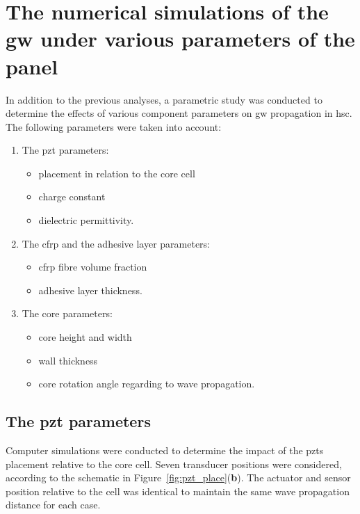 \section{The numerical simulations of the \acl{gw} under various parameters of the panel}
\label{sec:parameters}

In addition to the previous analyses, a parametric study was conducted to determine the effects of various component parameters on \ac{gw} propagation in \ac{hsc}. The following parameters were taken into account:
\begin{enumerate}
	\item The \ac{pzt} parameters:
	\begin{itemize}
		\item placement in relation to the core cell
		\item charge constant
		\item dielectric permittivity.
	\end{itemize}
	\item The \ac{cfrp} and the adhesive layer parameters:
		\begin{itemize}
		\item \ac{cfrp} fibre volume fraction
		\item adhesive layer thickness.
		\end{itemize}
	\item The core parameters:
	\begin{itemize}
		\item core height and width
		\item wall thickness
		\item core rotation angle regarding to wave propagation.
	\end{itemize}
\end{enumerate}

\subsection{The \acl{pzt} parameters}
Computer simulations were conducted to determine the impact of the \acp{pzt} placement relative to the core cell.
Seven transducer positions were considered, according to the schematic in Figure~\ref{fig:pzt_place}(\textbf{b}).
The actuator and sensor position relative to the cell was identical to maintain the same wave propagation distance for each case.


